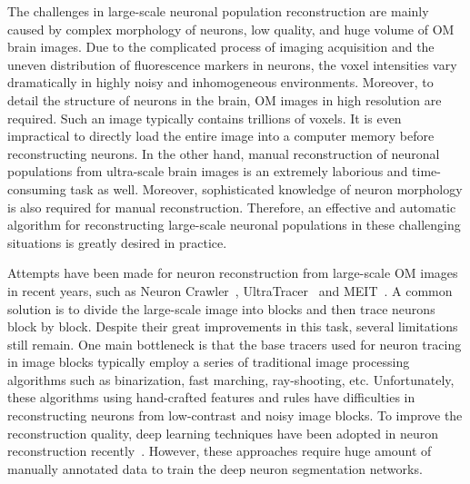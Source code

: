 The challenges in large-scale neuronal population reconstruction are mainly caused by complex morphology of neurons, low quality, and huge volume of OM brain images.
Due to the complicated process of imaging acquisition and the uneven distribution of fluorescence markers in neurons, the voxel intensities vary dramatically in highly noisy and inhomogeneous environments.
Moreover, to detail the structure of neurons in the brain, OM images in high resolution are required. Such an image typically contains trillions of voxels. It is even impractical to directly load the entire image into a computer memory before reconstructing neurons.
In the other hand, manual reconstruction of neuronal populations from ultra-scale brain images is an extremely laborious and time-consuming task as well.
Moreover, sophisticated knowledge of neuron morphology is also required for manual reconstruction.
%
Therefore, an effective and automatic algorithm for reconstructing large-scale neuronal populations in these challenging situations is greatly desired in practice.
 
 
Attempts have been made for neuron reconstruction from large-scale OM images in recent years, such as Neuron Crawler~\cite{Zhou2015}, UltraTracer~\cite{Peng2017} and MEIT~\cite{Wang2018}.
A common solution is to divide the large-scale image into blocks and then trace neurons block by block.
Despite their great improvements in this task, several limitations still remain.
%
One main bottleneck is that the base tracers used for neuron tracing in image blocks typically employ a series of traditional image processing algorithms such as binarization, fast marching, ray-shooting, etc. 
Unfortunately, these algorithms using hand-crafted features and rules have difficulties in reconstructing neurons from low-contrast and noisy image blocks.
To improve the reconstruction quality, deep learning techniques have been adopted in neuron reconstruction recently~\cite{Xu2016, Li2017, Zhou2018, Kozinski-MIA2020}. 
However, these approaches require huge amount of manually annotated data to train the deep neuron segmentation networks.
%

